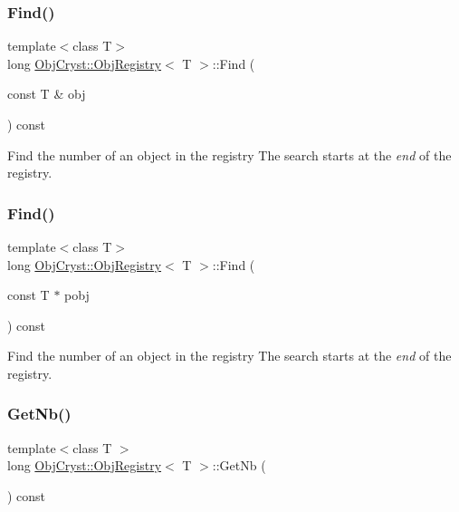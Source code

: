 \subsubsection{\texorpdfstring{Find()}{Find()}\hspace{0.1cm}{\footnotesize\ttfamily [3/4]}}
{\footnotesize\ttfamily template$<$class T$>$ \\
long \mbox{\hyperlink{class_obj_cryst_1_1_obj_registry}{Obj\+Cryst\+::\+Obj\+Registry}}$<$ T $>$\+::Find (\begin{DoxyParamCaption}\item[{const T \&}]{obj }\end{DoxyParamCaption}) const}

Find the number of an object in the registry The search starts at the {\itshape end} of the registry. \mbox{\label{class_obj_cryst_1_1_obj_registry_af50ff94a6fe0ea811d330649914a6d05}} 
\subsubsection{\texorpdfstring{Find()}{Find()}\hspace{0.1cm}{\footnotesize\ttfamily [4/4]}}
{\footnotesize\ttfamily template$<$class T$>$ \\
long \mbox{\hyperlink{class_obj_cryst_1_1_obj_registry}{Obj\+Cryst\+::\+Obj\+Registry}}$<$ T $>$\+::Find (\begin{DoxyParamCaption}\item[{const T $\ast$}]{pobj }\end{DoxyParamCaption}) const}

Find the number of an object in the registry The search starts at the {\itshape end} of the registry. \mbox{\label{class_obj_cryst_1_1_obj_registry_a5bd48c843107f24355d42ab857979744}} 
\subsubsection{\texorpdfstring{GetNb()}{GetNb()}}
{\footnotesize\ttfamily template$<$class T $>$ \\
long \mbox{\hyperlink{class_obj_cryst_1_1_obj_registry}{Obj\+Cryst\+::\+Obj\+Registry}}$<$ T $>$\+::Get\+Nb (\begin{DoxyParamCaption}{ }\end{DoxyParamCaption}) const}

